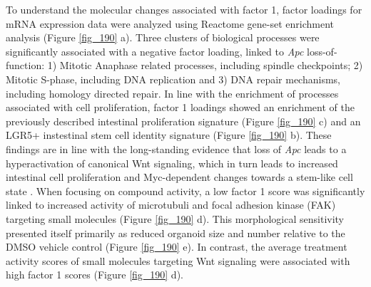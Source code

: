 \begin{flushleft}
To understand the molecular changes associated with factor 1, factor loadings for mRNA expression data were analyzed using Reactome gene-set enrichment analysis (Figure \ref{fig_190} a). Three clusters of biological processes were significantly associated with a negative factor loading, linked to \textit{Apc} loss-of-function: 1) Mitotic Anaphase related processes, including spindle checkpoints; 2) Mitotic S-phase, including DNA replication and 3) DNA repair mechanisms, including homology directed repair. In line with the enrichment of processes associated with cell proliferation, factor 1 loadings showed an enrichment of the previously described intestinal proliferation signature (Figure \ref{fig_190} c) and an LGR5+ instestinal stem cell identity signature (Figure \ref{fig_190} b). These findings are in line with the long-standing evidence that loss of \textit{Apc} leads to a hyperactivation of canonical Wnt signaling, which in turn leads to increased intestinal cell proliferation and Myc-dependent changes towards a stem-like cell state \parencite{sansomMycDeletionRescues2007, satohGlobalMetabolicReprogramming2017}. When focusing on compound activity, a low factor 1 score was significantly linked to increased activity of microtubuli and focal adhesion kinase (FAK) targeting small molecules (Figure \ref{fig_190} d). This morphological sensitivity presented itself primarily as reduced organoid size and number relative to the DMSO vehicle control (Figure \ref{fig_190} e). In contrast, the average treatment activity scores of small molecules targeting Wnt signaling were associated with high factor 1 scores (Figure \ref{fig_190} d).  


\end{flushleft}

